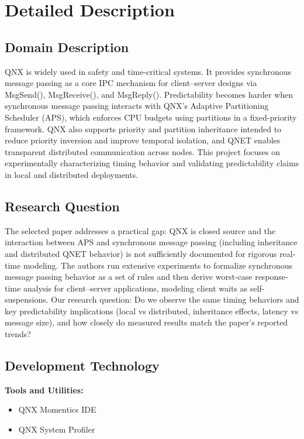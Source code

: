 \documentclass[11pt]{article}
\begin{document}
\section{Detailed Description}

\subsection{Domain Description}

QNX is widely used in safety and time-critical systems. It provides synchronous message passing as a core IPC mechanism for client--server designs via MsgSend(), MsgReceive(), and MsgReply(). Predictability becomes harder when synchronous message passing interacts with QNX's Adaptive Partitioning Scheduler (APS), which enforces CPU budgets using partitions in a fixed-priority framework. QNX also supports priority and partition inheritance intended to reduce priority inversion and improve temporal isolation, and QNET enables transparent distributed communication across nodes. This project focuses on experimentally characterizing timing behavior and validating predictability claims in local and distributed deployments.

\subsection{Research Question}

The selected paper addresses a practical gap: QNX is closed source and the interaction between APS and synchronous message passing (including inheritance and distributed QNET behavior) is not sufficiently documented for rigorous real-time modeling. The authors run extensive experiments to formalize synchronous message passing behavior as a set of rules and then derive worst-case response-time analysis for client--server applications, modeling client waits as self-suspensions. Our research question: Do we observe the same timing behaviors and key predictability implications (local vs distributed, inheritance effects, latency vs message size), and how closely do measured results match the paper's reported trends?

\subsection{Development Technology}

\noindent\textbf{Tools and Utilities:}
\begin{itemize}
\item QNX Momentics IDE
\item QNX System Profiler
\end{itemize}
\end{document}
